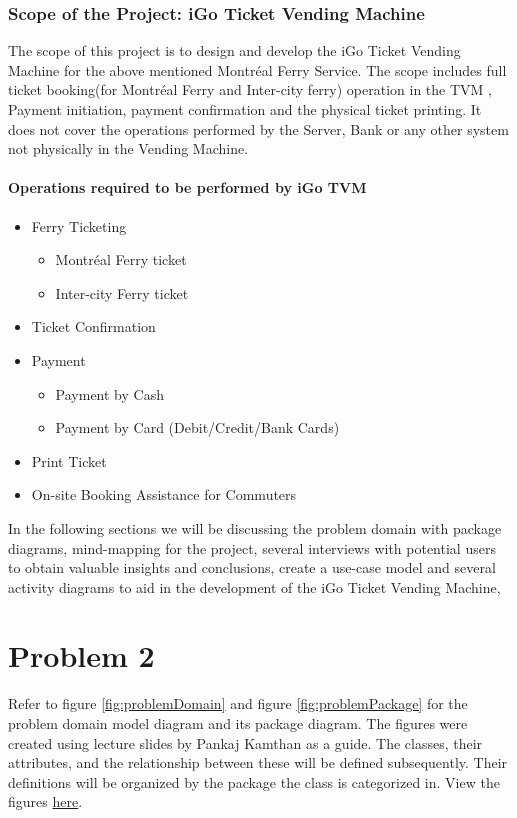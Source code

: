 \documentclass[letterpaper]{report}
\begin{document}
\subsection{Scope of the Project: iGo Ticket Vending Machine}
The scope of this project is to design and develop the iGo Ticket Vending Machine for the above mentioned Montréal Ferry Service. The scope includes full ticket booking(for Montréal Ferry and Inter-city ferry) operation in the TVM , Payment initiation, payment confirmation and the physical ticket printing. It does not cover the operations performed by the Server, Bank or any other system not physically in the Vending Machine. 
\subsubsection{Operations required to be performed by iGo TVM}
\begin{itemize}
    \item Ferry Ticketing
     \begin{itemize}
        \item Montréal Ferry ticket
        \item Inter-city Ferry ticket
    \end{itemize}
    \item Ticket Confirmation
    \item Payment 
    \begin{itemize}
        \item Payment by Cash
        \item Payment by Card (Debit/Credit/Bank Cards)
    \end{itemize}
    \item Print Ticket
    \item On-site Booking Assistance for Commuters 
\end{itemize}
\vspace{\baselineskip}

In the following sections we will be discussing the problem domain with package diagrams, mind-mapping for the project, several interviews with potential users to obtain valuable insights and conclusions, create a use-case model and several activity diagrams to aid in the development of the iGo Ticket Vending Machine,

\chapter{Problem 2}
Refer to figure \ref{fig:problemDomain} and figure \ref{fig:problemPackage} for the problem domain model diagram and its package diagram. The figures were created using lecture slides by Pankaj Kamthan\cite{DomainModelDiagramming} as a guide. The classes, their attributes, and the relationship between these will be defined subsequently. Their definitions will be organized by the package the class is categorized in. View the figures \href{https://drive.google.com/file/d/1l209HYuvMnJnniDuLFu2vUxGI3H7XldU/view?usp=sharing}{here}.
\end{document}

